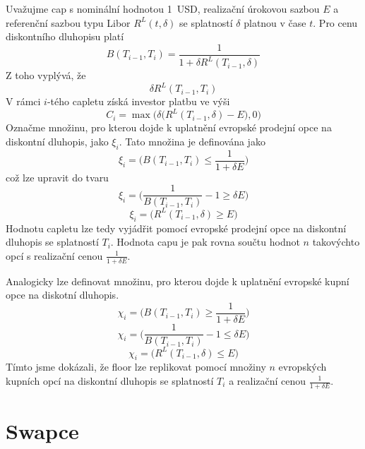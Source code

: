 \documentclass[a4paper]{book}
\begin{document}
Uvažujme cap s nominální hodnotou 1~USD, realizační úrokovou sazbou $E$ a referenční sazbou typu Libor $R^L(t, \delta)$ se splatností $\delta$ platnou v čase $t$. Pro cenu diskontního dluhopisu platí
\begin{equation*}
B(T_{i-1},T_i) = \frac{1}{1 + \delta R^L(T_{i-1}, \delta)}
\end{equation*}
Z toho vyplývá, že
\begin{equation*}
\delta R^L(T_{i-1}, T_i)
\end{equation*}
V rámci $i$-tého capletu získá investor platbu ve výši
\begin{equation*}
C_i = \max \bigg( \delta \big(R^L(T_{i-1}, \delta) - E \big), 0 \bigg)
\end{equation*}
Označme množinu, pro kterou dojde k uplatnění evropské prodejní opce na diskontní dluhopis, jako $\xi_i$. Tato množina je definována jako
\begin{equation*}
\xi_i = \Bigg( B(T_{i-1}, T_i) \le \frac{1}{1 + \delta E} \Bigg)
\end{equation*}
což lze upravit do tvaru
\begin{equation*}
\xi_i = \Bigg( \frac{1}{B(T_{i-1}, T_i)} - 1 \ge \delta E \Bigg)
\end{equation*}
\begin{equation*}
\xi_i = \big( R^L(T_{i-1}, \delta) \ge E \big)
\end{equation*}
Hodnotu capletu lze tedy vyjádřit pomocí evropské prodejní opce na diskontní dluhopis se splatností $T_i$. Hodnota capu je pak rovna součtu hodnot $n$ takovýchto opcí s realizační cenou $\frac{1}{1 + \delta E}$.

Analogicky lze definovat množinu, pro kterou dojde k uplatnění evropské kupní opce na diskotní dluhopis.
\begin{equation*}
\chi_i = \Bigg( B(T_{i-1}, T_i) \ge \frac{1}{1 + \delta E} \Bigg)
\end{equation*}
\begin{equation*}
\chi_i = \Bigg( \frac{1}{B(T_{i-1}, T_i)} - 1 \le \delta E \Bigg)
\end{equation*}
\begin{equation*}
\chi_i = \big( R^L(T_{i-1}, \delta) \le E \big)
\end{equation*}
Tímto jsme dokázali, že floor lze replikovat pomocí množiny $n$ evropských kupních opcí na diskontní dluhopis se splatností $T_i$ a realizační cenou $\frac{1}{1 + \delta E}$.

\section{Swapce}
\end{document}
